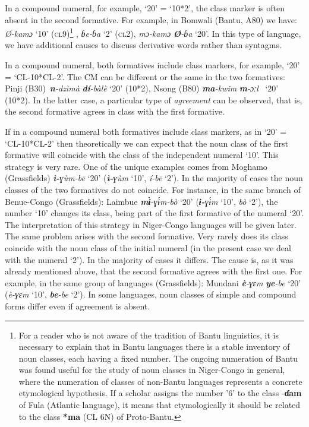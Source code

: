 \begin{enumerate}
In a compound numeral, for example, ‘20’ = ‘10*2’, the class marker is often absent in the second formative. For example, in Bomwali (Bantu, A80) we have: \textit{Ø-kamɔ} ‘10’ (\textsc{cl}9)\footnote{For a reader who is not aware of the tradition of Bantu linguistics, it is necessary to explain that in Bantu languages there is a stable inventory of noun classes, each having a fixed number. The ongoing numeration of Bantu was found useful for the study of noun classes in Niger-Congo in general, where the numeration of classes of non-Bantu languages represents a concrete etymological hypothesis. If a scholar assigns the number '6' to the class -\textbf{ɗam} of Fula (Atlantic language), it means that etymologically it should be related to the class \textbf{*ma} (CL 6N) of Proto-Bantu.} ,  \textit{ɓe-ɓa}  ‘2’ (\textsc{cl}2),  \textit{mɔ-kamɔ} \textbf{\textit{Ø}}\textit{-ɓa} ‘20’. In this type of language, we have additional causes to discuss derivative words rather than syntagms. 

In a compound numeral, both formatives include class markers, for example, ‘20’ = ‘CL-10*CL-2’. The CM can be different or the same in the two formatives: Pinji (B30)~\textbf{\textit{n}}\textit{-dzìm{\`{a}}} \textbf{\textit{dí}}\textit{-b{\`{a}}l{\`{e}}} ‘20’ (10*2), Nsong (B80) \textbf{\textit{ma}}\textit{-kw{\v{i}}m} \textbf{\textit{m}}\textit{-ɔːl}~ ‘20’ (10*2). In the latter case, a particular type of \textit{agreement} can be observed, that is, the second formative agrees in class with the first formative. 

If in a compound numeral both formatives include class markers, as in ‘20’ = ‘CL-10*CL-2’ then theoretically we can expect that the noun class of the first formative will coincide with the class of the independent numeral `10'. This strategy is very rare. One of the unique examples comes from Moghamo (Grassfields) \textbf{\textit{ì-}}\textit{ɣ{\`{u}}m-b{\={e}}} ‘20’ (\textbf{\textit{ì-}}\textit{ɣ{\`{u}}m} ‘10’,  \textit{í-b{\={e}}}  ‘2’).  In the majority of cases the noun classes of the two formatives do not coincide. For instance, in the same branch of Benue-Congo (Grassfields): Laimbue \textbf{\textit{m{\`{ɨ}}}}\textit{-ɣ{\'{ɨ}}m-b{\`{o}}} ‘20’ (\textbf{\textit{ɨ-}}\textit{ɣ{\'{ɨ}}m} ‘10', \textit{b{\`{o}}} ‘2’), the number `10' changes its class, being part of the first formative of the numeral `20'. The interpretation of this strategy in Niger-Congo languages will be given later. The same problem arises with the second formative. Very rarely does its class coincide with the noun class of the initial numeral (in the present case we deal with the numeral `2'). In the majority of cases it differs. The cause is, as it was already mentioned above, that the second formative agrees with the first one. For example, in the same group of languages (Grassfields): Mundani \textbf{\textit{{\`{e}}}}\textit{-ɣɛm} \textbf{\textit{ye}}\textit{-be} ‘20’  (\textit{{\`{e}}-ɣɛm} ‘10’, \textbf{\textit{be}}\textit{-be} ‘2’). In some languages, noun classes of simple and compound forms differ even if agreement is absent. 


\end{enumerate}
